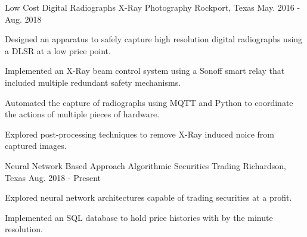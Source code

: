 

\begin{cventries}
  \cventry
    {Low Cost Digital Radiographs} %
    {X-Ray Photography} %
    {Rockport, Texas} %
    {May. 2016 - Aug. 2018} %
	{
	\begin{cvitems} %
		\item {
			Designed an apparatus to safely capture high resolution
			digital radiographs using a DLSR at
			\newline
			a low price point.
		}
		\item {
			Implemented an X-Ray beam control system using a Sonoff
			smart relay that included multiple
			\newline
			redundant safety mechanisms.
		}
		\item {
			Automated the capture of radiographs using MQTT and Python
			to coordinate the actions of multiple
			\newline
			pieces of hardware.
		}
		\item {
			Explored post-processing techniques to remove X-Ray induced
			noice from captured images.
		}
	\end{cvitems}
	}
  \cventry
  	{Neural Network Based Approach} %
    {Algorithmic Securities Trading} %
    {Richardson, Texas} %
    {Aug. 2018 - Present} %
	{
	\begin{cvitems} %
		\item {
			Explored neural network architectures capable of trading
			securities at a profit.
		}
		\item {
			Implemented an SQL database to hold price histories with
			by the minute resolution.
		}
	\end{cvitems}
	}
\end{cventries}
